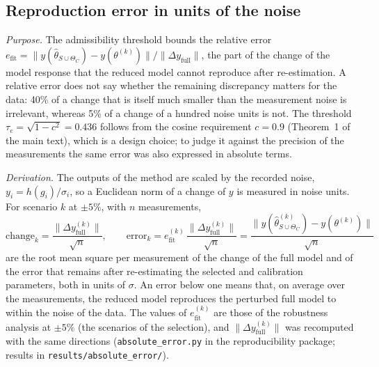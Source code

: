 \subsection*{Reproduction error in units of the noise}
\emph{Purpose.} The admissibility threshold bounds the relative error $e_{\mathrm{fit}}=\|y(\hat\theta_{S\cup\Theta_C})-y(\theta^{(k)})\|/\|\Delta y_{\mathrm{full}}\|$, the part of the change of the model response that the reduced model cannot reproduce after re-estimation. A relative error does not say whether the remaining discrepancy matters for the data: 40\% of a change that is itself much smaller than the measurement noise is irrelevant, whereas 5\% of a change of a hundred noise units is not. The threshold $\tau_e=\sqrt{1-c^2}=0.436$ follows from the cosine requirement $c=0.9$ (Theorem~1 of the main text), which is a design choice; to judge it against the precision of the measurements the same error was also expressed in absolute terms.

\emph{Derivation.} The outputs of the method are scaled by the recorded noise, $y_i=h(g_i)/\sigma_i$, so a Euclidean norm of a change of $y$ is measured in noise units. For scenario $k$ at $\pm5\%$, with $n$ measurements,
\[ \text{change}_k=\frac{\|\Delta y^{(k)}_{\mathrm{full}}\|}{\sqrt n},\qquad \text{error}_k=e^{(k)}_{\mathrm{fit}}\,\frac{\|\Delta y^{(k)}_{\mathrm{full}}\|}{\sqrt n}=\frac{\|y(\hat\theta^{(k)}_{S\cup\Theta_C})-y(\theta^{(k)})\|}{\sqrt n} \]
are the root mean square per measurement of the change of the full model and of the error that remains after re-estimating the selected and calibration parameters, both in units of $\sigma$. An error below one means that, on average over the measurements, the reduced model reproduces the perturbed full model to within the noise of the data. The values of $e^{(k)}_{\mathrm{fit}}$ are those of the robustness analysis at $\pm5\%$ (the scenarios of the selection), and $\|\Delta y^{(k)}_{\mathrm{full}}\|$ was recomputed with the same directions (\texttt{absolute\_error.py} in the reproducibility package; results in \texttt{results/absolute\_error/}).

